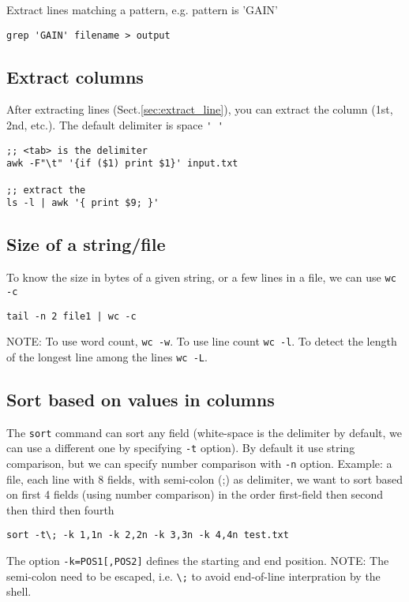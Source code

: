 Extract lines matching a pattern, e.g. pattern is 'GAIN'
\begin{verbatim}
grep 'GAIN' filename > output
\end{verbatim}

\subsection{Extract columns}

After extracting lines (Sect.\ref{sec:extract_line}), you can extract the column
(1st, 2nd, etc.). The default delimiter is space \verb!' '!
\begin{verbatim}
;; <tab> is the delimiter
awk -F"\t" '{if ($1) print $1}' input.txt

;; extract the 
ls -l | awk '{ print $9; }' 
\end{verbatim}

\subsection{Size of a string/file}
\label{sec:size_in_bytes}


To know the size in bytes of a given string, or a few lines in a file, we can
use  \verb!wc -c!
\begin{verbatim}
tail -n 2 file1 | wc -c

\end{verbatim}

NOTE: To use word count, \verb!wc -w!. To use line count \verb!wc -l!. To detect
the length of the longest line among the lines \verb!wc -L!.

\subsection{Sort based on values in columns}

The \verb!sort! command can sort any field (white-space is the delimiter by
default, we can use a different one by specifying \verb!-t! option). By default
it use string comparison, but we can specify number comparison with \verb!-n!
option. Example: a file, each line with 8 fields, with semi-colon (;) as
delimiter, we want to sort based on first 4 fields (using number comparison) in
the order first-field then second then third then fourth
\begin{verbatim}
sort -t\; -k 1,1n -k 2,2n -k 3,3n -k 4,4n test.txt
\end{verbatim}
The option \verb!-k=POS1[,POS2]! defines the starting and end position. NOTE:
The semi-colon need to be escaped, i.e. \verb!\;! to avoid end-of-line
interpration by the shell.

